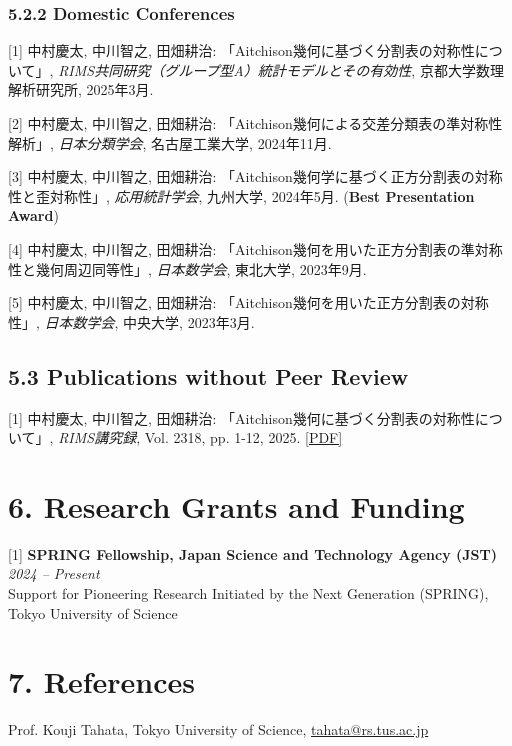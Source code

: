 \documentclass[11pt,a4paper]{article}
\begin{document}
\subsubsection*{5.2.2 Domestic Conferences}

[1] 中村慶太, 中川智之, 田畑耕治: 「Aitchison幾何に基づく分割表の対称性について」, \textit{RIMS共同研究（グループ型A）統計モデルとその有効性}, 京都大学数理解析研究所, 2025年3月.

\vspace{0.3em}
[2] 中村慶太, 中川智之, 田畑耕治: 「Aitchison幾何による交差分類表の準対称性解析」, \textit{日本分類学会}, 名古屋工業大学, 2024年11月.

\vspace{0.3em}
[3] 中村慶太, 中川智之, 田畑耕治: 「Aitchison幾何学に基づく正方分割表の対称性と歪対称性」, \textit{応用統計学会}, 九州大学, 2024年5月. (\textbf{Best Presentation Award})

\vspace{0.3em}
[4] 中村慶太, 中川智之, 田畑耕治: 「Aitchison幾何を用いた正方分割表の準対称性と幾何周辺同等性」, \textit{日本数学会}, 東北大学, 2023年9月.

\vspace{0.3em}
[5] 中村慶太, 中川智之, 田畑耕治: 「Aitchison幾何を用いた正方分割表の対称性」, \textit{日本数学会}, 中央大学, 2023年3月.

\subsection*{5.3 Publications without Peer Review}

[1] 中村慶太, 中川智之, 田畑耕治: 「Aitchison幾何に基づく分割表の対称性について」, \textit{RIMS講究録}, Vol. 2318, pp. 1-12, 2025. \href{https://www.kurims.kyoto-u.ac.jp/~kyodo/kokyuroku/contents/pdf/2318-01.pdf}{[PDF]}

\section*{6. Research Grants and Funding}

[1] \textbf{SPRING Fellowship, Japan Science and Technology Agency (JST)} \hfill \textit{2024 -- Present}\\
Support for Pioneering Research Initiated by the Next Generation (SPRING), Tokyo University of Science

\section*{7. References}

Prof. Kouji Tahata, Tokyo University of Science, \href{mailto:tahata@rs.tus.ac.jp}{tahata@rs.tus.ac.jp}
\end{document}
